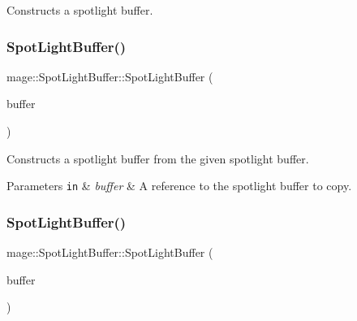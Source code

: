 Constructs a spotlight buffer. \hypertarget{structmage_1_1_spot_light_buffer_a572e805bf8eef2a1183162ae68877ade}{}\label{structmage_1_1_spot_light_buffer_a572e805bf8eef2a1183162ae68877ade} 
\subsubsection{\texorpdfstring{Spot\+Light\+Buffer()}{SpotLightBuffer()}\hspace{0.1cm}{\footnotesize\ttfamily [2/3]}}
{\footnotesize\ttfamily mage\+::\+Spot\+Light\+Buffer\+::\+Spot\+Light\+Buffer (\begin{DoxyParamCaption}\item[{const \hyperlink{structmage_1_1_spot_light_buffer}{Spot\+Light\+Buffer} \&}]{buffer }\end{DoxyParamCaption})\hspace{0.3cm}{\ttfamily [default]}}

Constructs a spotlight buffer from the given spotlight buffer.


\begin{DoxyParams}[1]{Parameters}
\mbox{\tt in}  & {\em buffer} & A reference to the spotlight buffer to copy. \\
\hline
\end{DoxyParams}
\hypertarget{structmage_1_1_spot_light_buffer_a0dd63c65417578b6001b1c7f2195452c}{}\label{structmage_1_1_spot_light_buffer_a0dd63c65417578b6001b1c7f2195452c} 
\subsubsection{\texorpdfstring{Spot\+Light\+Buffer()}{SpotLightBuffer()}\hspace{0.1cm}{\footnotesize\ttfamily [3/3]}}
{\footnotesize\ttfamily mage\+::\+Spot\+Light\+Buffer\+::\+Spot\+Light\+Buffer (\begin{DoxyParamCaption}\item[{\hyperlink{structmage_1_1_spot_light_buffer}{Spot\+Light\+Buffer} \&\&}]{buffer }\end{DoxyParamCaption})\hspace{0.3cm}{\ttfamily [default]}}

